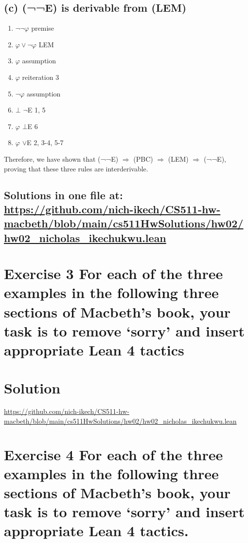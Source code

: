 \documentclass{article}
\newenvironment{proof}
{\begin{mdframed}[linewidth=0.5pt]\begin{enumerate}[label=\arabic*.,leftmargin=*]}
{\end{enumerate}\end{mdframed}}
\begin{document}
\subsection*{(c) (¬¬E) is derivable from (LEM)}

\begin{proof}
\item $\neg\neg\varphi$ \hfill premise
\item $\varphi \lor \neg\varphi$ \hfill LEM
\item \quad $\varphi$ \hfill assumption
\item \quad $\varphi$ \hfill reiteration 3
\item \quad $\neg\varphi$ \hfill assumption
\item \quad $\bot$ \hfill $\neg$E 1, 5
\item \quad $\varphi$ \hfill $\bot$E 6
\item $\varphi$ \hfill $\lor$E 2, 3-4, 5-7
\end{proof}

Therefore, we have shown that (¬¬E) $\Rightarrow$ (PBC) $\Rightarrow$ (LEM) $\Rightarrow$ (¬¬E), proving that these three rules are interderivable.




\newpage

\subsection*{Solutions in one file at: 
\url{https://github.com/nich-ikech/CS511-hw-macbeth/blob/main/cs511HwSolutions/hw02/hw02_nicholas_ikechukwu.lean}}

\newpage

\section*{Exercise 3 For each of the three examples in the following three sections of Macbeth’s book, your
task is to remove ‘sorry’ and insert appropriate Lean 4 tactics}
\section*{Solution}
\url{https://github.com/nich-ikech/CS511-hw-macbeth/blob/main/cs511HwSolutions/hw02/hw02_nicholas_ikechukwu.lean}

\newpage

\section*{Exercise 4 For each of the three examples in the following three sections of Macbeth’s book, your
task is to remove ‘sorry’ and insert appropriate Lean 4 tactics.}
\end{document}
